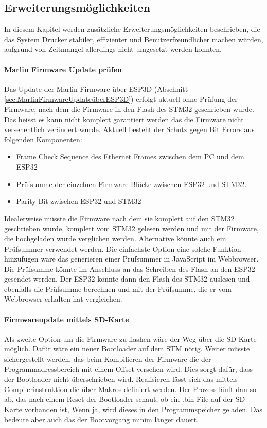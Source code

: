 \subsection{Erweiterungsmöglichkeiten}
\label{sec:Erweiterungsmöglichkeiten}
In diesem Kapitel werden zusätzliche Erweiterungsmöglichkeiten beschrieben, die das System Drucker stabiler, effizienter und Benutzerfreundlicher machen würden, aufgrund von Zeitmangel allerdings nicht umgesetzt werden konnten.


\paragraph{Marlin Firmware Update prüfen}
Das Update der Marlin Firmware über ESP3D (Abschnitt \ref{sec:MarlinFirmwareUpdateüberESP3D}) erfolgt aktuell ohne Prüfung der Firmware, nach dem die Firmware in den Flash des STM32 geschrieben wurde. Das heisst es kann nicht komplett garantiert werden das die Firmware nicht versehentlich verändert wurde. Aktuell besteht der Schutz gegen Bit Errors aus folgenden Komponenten:
\begin{itemize}
	\item  Frame Check Sequence des Ethernet Frames zwischen dem PC und dem ESP32
    \item  Prüfsumme der einzelnen Firmware Blöcke zwischen ESP32 und STM32.  
    \item  Parity Bit zwischen ESP32 und STM32
\end{itemize}

Idealerweise müsste die Firmware nach dem sie komplett auf den STM32 geschrieben wurde, komplett vom STM32 gelesen werden und mit der Firmware, die hochgeladen wurde verglichen werden. Alternative könnte auch ein Prüfsummer verwendet werden. Die einfachste Option eine solche Funktion hinzufügen wäre das generieren einer Prüfsummer in JavaScript im Webbrowser. Die Prüfsumme könnte im Anschluss an das Schreiben des Flash an den ESP32 gesendet werden. Der ESP32 könnte dann den Flash des STM32 auslesen und ebenfalls die Prüfsumme berechnen und mit der Prüfsumme, die er vom Webbrowser erhalten hat vergleichen.\\

\paragraph{Firmwareupdate mittels SD-Karte}
Als zweite Option um die Firmware zu flashen wäre der Weg über die SD-Karte möglich. Dafür wäre ein neuer Bootloader auf dem STM nötig. Weiter müsste sichergestellt werden, das beim Kompilieren der Firmware die der Programmadressbereich mit einem Offset versehen wird. Dies sorgt dafür, dass der Bootloader nicht überschrieben wird. Realisieren lässt sich das mittels Compilerinstruktion die über Makros definiert werden. 
Der Prozess läuft dan so ab, das nach einem Reset der Bootloader schaut, ob ein .bin File auf der SD-Karte vorhanden ist, Wenn ja, wird dieses in den Programmspeicher geladen. Das bedeute aber auch das der Bootvorgang minim länger dauert. \\

